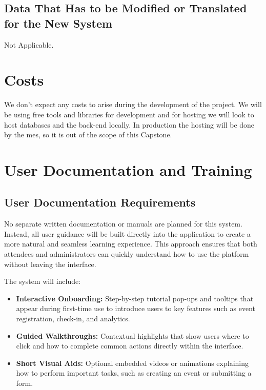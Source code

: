 \documentclass[12pt]{article}
\begin{document}
\subsection{Data That Has to be Modified or Translated for the New System}
Not Applicable.

\section{Costs}
We don't expect any costs to arise during the development of the project. We will be using free tools and libraries for
development and for hosting we will look to host databases and the back-end locally. In production the hosting will be
done by the \gls{mes}, so it is out of the scope of this Capstone.

\section{User Documentation and Training}

\subsection{User Documentation Requirements}

No separate written documentation or manuals are planned for this system.
Instead, all user guidance will be built directly into the application to create a more natural and seamless learning experience.
This approach ensures that both attendees and administrators can quickly understand how to use the platform without leaving the interface.

The system will include:
\begin{itemize}
    \item \textbf{Interactive Onboarding:}
    Step-by-step tutorial pop-ups and tooltips that appear during first-time use to introduce users to key features such as event registration, check-in, and analytics.

    \item \textbf{Guided Walkthroughs:}
    Contextual highlights that show users where to click and how to complete common actions directly within the interface.

    \item \textbf{Short Visual Aids:}
    Optional embedded videos or animations explaining how to perform important tasks, such as creating an event or submitting a form.
\end{itemize}
\end{document}
